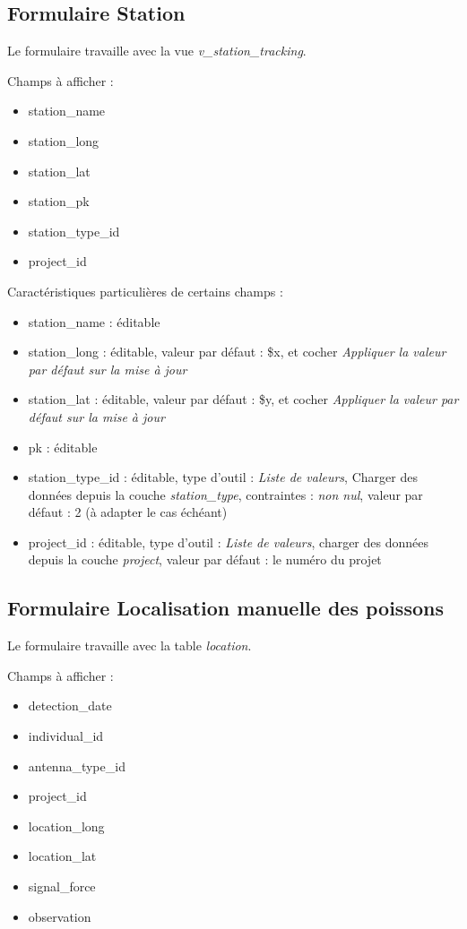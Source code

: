 \subsection{Formulaire Station}

Le formulaire travaille avec la vue \textit{v\_station\_tracking}.

Champs à afficher :
\begin{itemize}
	\item station\_name
	\item station\_long
	\item station\_lat
	\item station\_pk
	\item station\_type\_id
	\item project\_id
\end{itemize}

Caractéristiques particulières de certains champs :
\begin{itemize}
	\item station\_name : éditable
	\item station\_long : éditable, valeur par défaut : \$x, et cocher \textit{Appliquer la valeur par défaut sur la mise à jour}
	\item station\_lat : éditable, valeur par défaut : \$y, et cocher \textit{Appliquer la valeur par défaut sur la mise à jour}
	\item pk : éditable
	\item station\_type\_id : éditable, type d'outil : \textit{Liste de valeurs}, Charger des données depuis la couche \textit{station\_type}, contraintes : \textit{non nul}, valeur par défaut : 2 (à adapter le cas échéant)
	\item project\_id : éditable, type d'outil : \textit{Liste de valeurs}, charger des données depuis la couche \textit{project}, valeur par défaut : le numéro du projet
\end{itemize}

\subsection{Formulaire Localisation manuelle des poissons}

Le formulaire travaille avec la table \textit{location}. 

Champs à afficher : 
\begin{itemize}
	\item detection\_date
	\item individual\_id
	\item antenna\_type\_id
	\item project\_id
	\item location\_long
	\item location\_lat
	\item signal\_force
	\item observation
\end{itemize}

